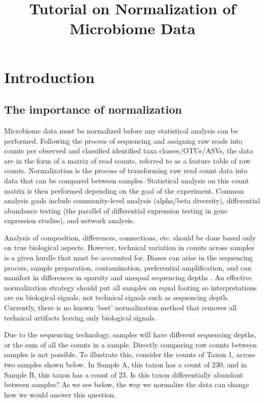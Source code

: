 \documentclass[
]{book}
\title{Tutorial on Normalization of Microbiome Data}
\author{}
\date{\vspace{-2.5em}}
\begin{document}
\maketitle

{
\setcounter{tocdepth}{1}
\tableofcontents
}
\hypertarget{intro}{%
\chapter{Introduction}\label{intro}}

\hypertarget{the-importance-of-normalization}{%
\section{The importance of normalization}\label{the-importance-of-normalization}}

Microbiome data must be normalized before any statistical analysis can be performed. Following the process of sequencing and assigning raw reads into counts per observed and classified identified taxa classes/OTUs/ASVs, the data are in the form of a matrix of read counts, referred to as a feature table of raw counts. Normalization is the process of transforming raw read count data into data that can be compared between samples. Statistical analysis on this count matrix is then performed depending on the goal of the experiment. Common analysis goals include community-level analysis (alpha/beta diversity), differential abundance testing (the parallel of differential expression testing in gene expression studies), and network analysis.

Analysis of composition, differences, connections, etc. should be done based only on true biological aspects. However, technical variation in counts across samples is a given hurdle that must be accounted for. Biases can arise in the sequencing process, sample preparation, contamination, preferential amplification, and can manifest in differences in sparsity and unequal sequencing depths \citep{salter2014}. An effective normalization strategy should put all samples on equal footing so interpretations are on biological signals, not technical signals such as sequencing depth. Currently, there is no known `best' normalization method that removes all technical artifacts leaving only biological signals.

Due to the sequencing technology, samples will have different sequencing depths, or the sum of all the counts in a sample. Directly comparing raw counts between samples is not possible. To illustrate this, consider the counts of Taxon 1, across two samples shown below. In Sample A, this taxon has a count of 230, and in Sample B, this taxon has a count of 23. Is this taxon differentially abundant between samples? As we see below, the way we normalize the data can change how we would answer this question.
\end{document}
